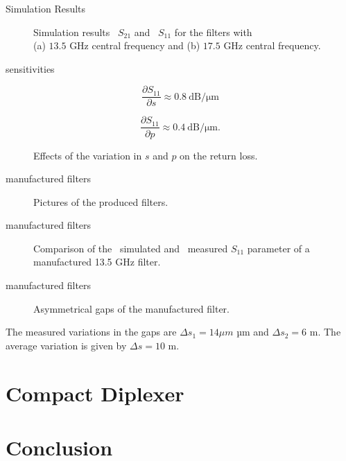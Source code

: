 \documentclass[student,english]{ihfBeamer} %
\begin{document}
\begin{frame}{Simulation Results}
\begin{figure}
	\centering
	\caption{Simulation results ~$S_{21}$ and ~$S_{11}$ for the filters with \\
		(a) $13.5$ GHz central frequency and
		(b) $17.5$ GHz central frequency.}
\end{figure}
\end{frame}

\begin{frame}{sensitivities}
	\begin{multicols}{2}
		\begin{equation}
		\frac{\partial S_{11}}{\partial s} \approx \SI{0.8}{\dB\per\micro\metre}
		\end{equation}
		
		\begin{equation}
		\frac{\partial S_{11}}{\partial p} \approx \SI{0.4}{\dB\per\micro\metre}.
		\end{equation}
	\end{multicols}
\begin{figure}[H]
	\caption{Effects of the variation in $s$ and $p$ on the return loss.}
\end{figure} 
\end{frame}

\begin{frame}{manufactured filters}
\begin{figure} [H]
	\caption{Pictures of the produced filters.}
\end{figure}
\end{frame}

\begin{frame}{manufactured filters}
     \begin{figure}[H]
	\centering
	\caption{Comparison of the ~simulated and ~measured $S_{11}$ parameter of a manufactured 13.5 GHz filter.}
\end{figure} 
\end{frame}

\begin{frame}{manufactured filters}
	\begin{figure}[H]
		\centering
		\caption{Asymmetrical gaps of the manufactured filter.}
	\end{figure} 
The measured variations in the gaps are $\Delta s_{1}=14\mu m$  µm and $\Delta s_{2}=6$ m. 
The average variation is given by $\Delta s= 10$ m.

\end{frame}

\section{Compact Diplexer}
\contentframe

\section{Conclusion}
\contentframe
\end{document}
